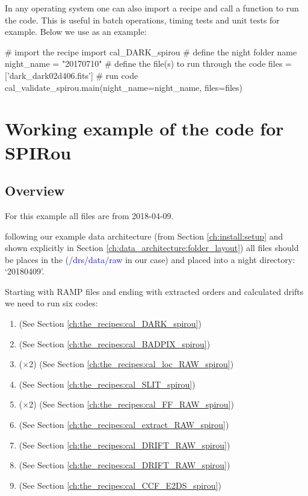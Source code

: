 In any operating system one can also import a recipe and call a function to run the code. This is useful in batch operations, timing tests and unit tests for example. Below we use \calDARK as an example:

\begin{pythonbox}
# import the recipe
import cal_DARK_spirou
# define the night folder name
night_name = "20170710"
# define the file(s) to run through the code
files = ['dark_dark02d406.fits']
# run code
cal_validate_spirou.main(night_name=night_name, files=files)
\end{pythonbox}

\clearpage
\newpage
\section{Working example of the code for SPIRou}
\label{chapter:using_the_drs:working_example}

\subsection{Overview}
\label{chapter:using_the_drs:working_example:overview}

For this example all files are from 2018-04-09.

\noindent following our example data architecture (from Section \ref{ch:install:setup} and shown explicitly in Section \ref{ch:data_architecture:folder_layout}) all files should be places in the  (\textcolor{blue}{/drs/data/raw} in our case) and placed into a night directory: `20180409'.

\noindent Starting with RAMP files and ending with extracted orders and calculated drifts we need to run six codes:
\begin{enumerate}
\item \calDARK \hfill (See Section \ref{ch:the_recipes:cal_DARK_spirou})
\item \calbadpix \hfill (See Section \ref{ch:the_recipes:cal_BADPIX_spirou})
\item \callocRAW ($\times$2) \hfill (See Section \ref{ch:the_recipes:cal_loc_RAW_spirou})
\item \calSLIT \hfill (See Section \ref{ch:the_recipes:cal_SLIT_spirou})
\item \calFFraw ($\times$2) \hfill (See Section \ref{ch:the_recipes:cal_FF_RAW_spirou})
\item \calextractRAW \hfill (See Section \ref{ch:the_recipes:cal_extract_RAW_spirou})
\item \calDRIFTE \hfill (See Section \ref{ch:the_recipes:cal_DRIFT_RAW_spirou})
\item \calDRIFTPEAK \hfill (See Section \ref{ch:the_recipes:cal_DRIFT_RAW_spirou})
\item \calCCF \hfill (See Section \ref{ch:the_recipes:cal_CCF_E2DS_spirou})
\end{enumerate}

